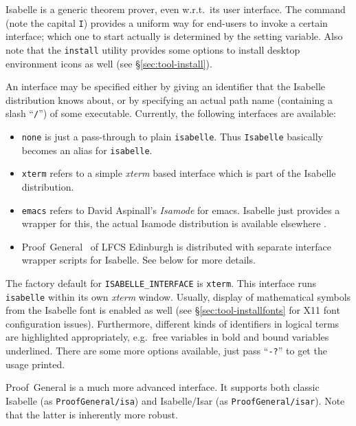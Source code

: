 Isabelle is a generic theorem prover, even w.r.t.\ its user interface.  The
 command (note the capital \texttt{I}) provides a uniform
way for end-users to invoke a certain interface; which one to start actually
is determined by the  setting variable.  Also note
that the \texttt{install} utility provides some options to install desktop
environment icons as well (see \S\ref{sec:tool-install}).

An interface may be specified either by giving an identifier that the Isabelle
distribution knows about, or by specifying an actual path name (containing a
slash ``\texttt{/}'') of some executable.  Currently, the following interfaces
are available:

\begin{itemize}
\item \texttt{none} is just a pass-through to plain \texttt{isabelle}. Thus
  \texttt{Isabelle} basically becomes an alias for \texttt{isabelle}.
  
\item \texttt{xterm} refers to a simple \textsl{xterm} based interface which
  is part of the Isabelle distribution.
  
\item \texttt{emacs} refers to David Aspinall's \emph{Isamode} for emacs.  Isabelle just provides a wrapper for this,
  the actual Isamode distribution is available elsewhere \cite{isamode}.
  
\item Proof~General~\cite{proofgeneral} of
  LFCS Edinburgh is distributed with separate interface wrapper scripts for
  Isabelle.  See below for more details.
\end{itemize}

The factory default for \texttt{ISABELLE_INTERFACE} is \texttt{xterm}.  This
interface runs \texttt{isabelle} within its own \textsl{xterm} window.
Usually, display of mathematical symbols from the Isabelle font is enabled as
well (see \S\ref{sec:tool-installfonts} for X11 font configuration issues).
Furthermore, different kinds of identifiers in logical terms are highlighted
appropriately, e.g.\ free variables in bold and bound variables underlined.
There are some more options available, just pass ``\texttt{-?}'' to get the
usage printed.

\medskip Proof~General is a much more
advanced interface.  It supports both classic Isabelle (as
\texttt{ProofGeneral/isa}) and Isabelle/Isar (as \texttt{ProofGeneral/isar}).
Note that the latter is inherently more robust.

